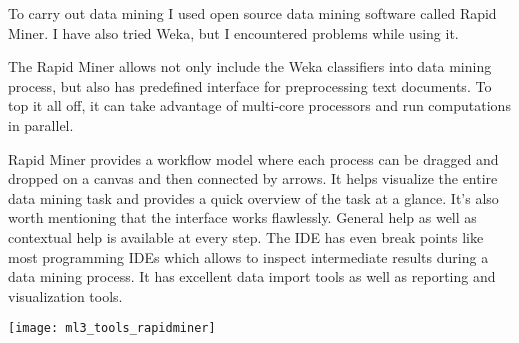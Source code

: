 
    To carry out data mining I used open source data mining software called Rapid Miner. I have also tried Weka, but I encountered problems while using it. 
    
    The Rapid Miner allows not only include the Weka classifiers into data mining process, but also has predefined interface for preprocessing text documents.
To top it all off, it can take advantage of multi-core processors and run computations in parallel.

Rapid Miner provides a workflow model where each process can be dragged and dropped on a canvas and then connected by arrows. It helps visualize the entire data mining task and provides a quick overview of the task at a glance. It's also worth mentioning that the interface works flawlessly. General help as well as contextual help is available at every step. The IDE has even break points like most programming IDEs which allows to inspect intermediate results during a data mining process. It has excellent data import tools as well as reporting and visualization tools.

\texttt{[image: ml3\_tools\_rapidminer]}
